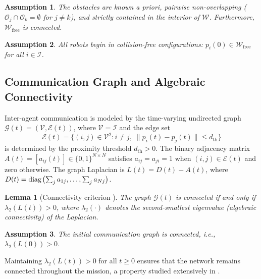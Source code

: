 \documentclass[letterpaper, 10 pt, journal, twoside]{IEEEtran}
\newcommand{\diag}{{\rm diag\;}}
\newtheorem{lemma}{Lemma}
\newtheorem{assumption}{Assumption}
\def\scr#1{{\mathcal #1}}
\begin{document}
\begin{assumption}
\label{asm:obstacles}
The obstacles are known a priori, pairwise non-overlapping
($\scr{O}_{j}\cap\scr{O}_{k}=\emptyset$ for $j\neq k$), and strictly
contained in the interior of $\scr{W}$.  Furthermore,
$\scr{W}_{\mathrm{free}}$ is connected.
\end{assumption}

\begin{assumption}
\label{asm:init_free}
All robots begin in collision-free configurations: $p_{i}(0)\in
\scr{W}_{\mathrm{free}}$ for all $i\in\scr{I}$.
\end{assumption}

\subsection{Communication Graph and Algebraic Connectivity}

Inter-agent communication is modeled by the time-varying undirected graph
$\scr{G}(t)=(\scr{V},\scr{E}(t))$, where $\scr{V}=\scr{I}$ and the edge set
\begin{equation}
  \scr{E}(t)=\bigl\{(i,j)\in\scr{V}^{2}:i\neq j,\;
  \|p_{i}(t)-p_{j}(t)\|\leq d_{\mathrm{th}}\bigr\}
  \label{eq:edges}
\end{equation}
is determined by the proximity threshold $d_{\mathrm{th}}>0$.  The binary
adjacency matrix $A(t)=[a_{ij}(t)]\in\{0,1\}^{N\times N}$ satisfies
$a_{ij}=a_{ji}=1$ when $(i,j)\in\scr{E}(t)$ and zero otherwise.  The graph
Laplacian is $L(t)=D(t)-A(t)$, where
$D(t)=\diag\!\bigl(\sum_{j}a_{1j},\ldots,\sum_{j}a_{Nj}\bigr)$.

\begin{lemma}[Connectivity criterion \cite{ji2007ITR}]
\label{lem:lambda2}
The graph $\scr{G}(t)$ is connected if and only if $\lambda_{2}(L(t))>0$,
where $\lambda_{2}(\cdot)$ denotes the second-smallest eigenvalue
(algebraic connectivity) of the Laplacian.
\end{lemma}

\begin{assumption}
\label{asm:init_conn}
The initial communication graph is connected, i.e.,
$\lambda_{2}(L(0))>0$.
\end{assumption}

Maintaining $\lambda_{2}(L(t))>0$ for all $t\geq 0$ ensures that the
network remains connected throughout the mission, a property studied
extensively in \cite{dimarogonas2010ICTA,ji2007ITR}.
\end{document}
